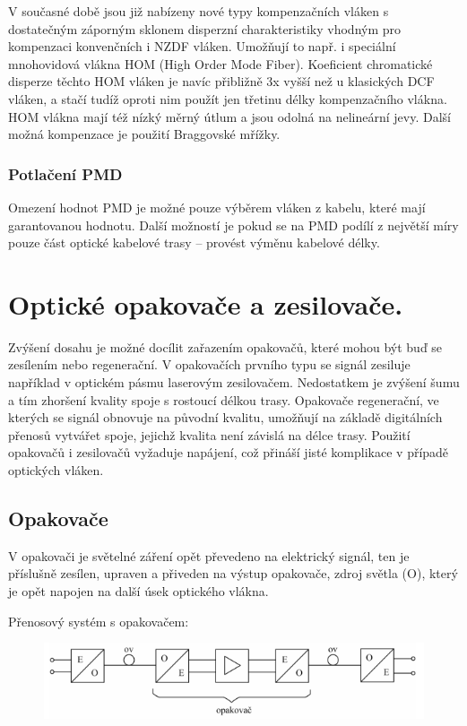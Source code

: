 V současné době jsou již nabízeny nové typy kompenzačních vláken s dostatečným záporným sklonem disperzní charakteristiky vhodným pro kompenzaci konvenčních i NZDF vláken. Umožňují to např. i speciální mnohovidová vlákna HOM (High Order Mode Fiber). Koeficient chromatické disperze těchto HOM vláken je navíc přibližně 3x vyšší než u klasických DCF vláken, a stačí tudíž oproti nim použít jen třetinu délky kompenzačního vlákna. HOM vlákna mají též nízký měrný útlum a jsou odolná na nelineární jevy. Další možná kompenzace je použití Braggovské mřížky.

\subsubsection{Potlačení PMD}
Omezení hodnot PMD je možné pouze výběrem vláken z kabelu, které mají garantovanou hodnotu. Další možností je pokud se na PMD podílí z největší míry pouze část optické kabelové trasy – provést výměnu kabelové délky.

\clearpage
\section{Optické opakovače a zesilovače.}
Zvýšení dosahu je možné docílit zařazením opakovačů, které mohou být buď se zesílením nebo regenerační. V opakovačích prvního typu se signál zesiluje například v optickém pásmu laserovým zesilovačem. Nedostatkem je zvýšení šumu a tím zhoršení kvality spoje s rostoucí délkou trasy. Opakovače regenerační, ve kterých se signál obnovuje na původní kvalitu, umožňují na základě digitálních přenosů vytvářet spoje, jejichž kvalita není závislá na délce trasy. Použití opakovačů i zesilovačů vyžaduje napájení, což přináší jisté komplikace v případě optických vláken.

\subsection{Opakovače}
V opakovači je světelné záření opět převedeno na elektrický signál, ten je příslušně zesílen, upraven a přiveden na výstup opakovače, zdroj světla (O), který je opět napojen na další úsek optického vlákna.

Přenosový systém s opakovačem:
\begin{figure}[!ht]
\begin{center}
    \includegraphics[scale=1]{obrazky/opak.png}
  \end{center}
\end{figure}

